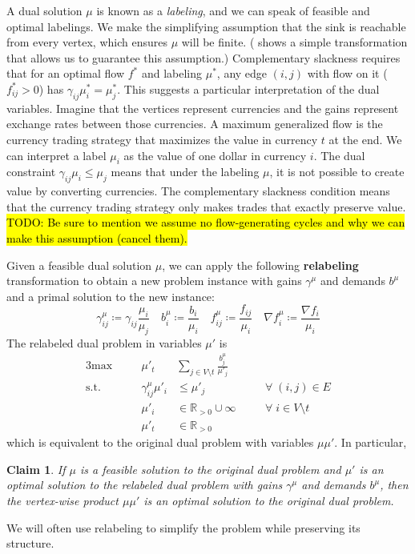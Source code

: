 \documentclass[11pt]{article}
\newtheorem{claim}[theorem]{Claim}
\theoremstyle{definition}
\theoremstyle{definition}
\newcommand{\R}{\mathbb{R}}
\newcommand{\giij}{\gamma_{ij}^{\mu}}
\newcommand{\todo}[1]{\hl{TODO: #1}}
\begin{document}
        
	A dual solution $\mu$ is known as a \emph{labeling}, and we can speak of feasible and
	optimal labelings. We make the simplifying assumption that the sink is reachable from every vertex, which ensures $\mu$ will be finite. (\cite{Olver2017} shows a simple transformation that allows us to guarantee this assumption.) 
	Complementary slackness requires that for an optimal flow $f^*$ and labeling $\mu^*$,
	any edge $(i, j)$ with flow on it ($f^*_{ij} > 0$) has $\gamma_{ij}\mu^*_i = \mu^*_j$.
	This suggests a particular interpretation of the dual variables. Imagine that
	the vertices represent currencies and the gains represent exchange rates between those currencies.
	A maximum generalized flow is the currency trading strategy that maximizes the value in currency
	$t$ at the end. We can interpret a label $\mu_i$ as the value of one dollar in currency $i$.
	The dual constraint $\gamma_{ij} \mu_i \leq \mu_j$ means that under the labeling $\mu$,
	it is not possible to create value by converting currencies.
	The complementary slackness condition means that the currency trading strategy
	only makes trades that exactly preserve value.
    \todo{Be sure to mention we assume no flow-generating cycles and why we can make this assumption (cancel them).}
	
	Given a feasible dual solution $\mu$, we can apply the following \textbf{relabeling}
    transformation to obtain a new problem instance with gains $\gamma^\mu$ and demands $b^\mu$
    and a primal solution to the new instance:
	\[ \gamma_{ij}^\mu \coloneqq \gamma_{ij} \frac{\mu_i}{\mu_j} \quad
	b_i^\mu \coloneqq \frac{b_i}{\mu_i} \quad
    f_{ij}^\mu \coloneqq \frac{f_{ij}}{\mu_i} \quad
	\nabla f_i^\mu \coloneqq \frac{\nabla f_i }{\mu_i} \]
    The relabeled dual problem in variables $\mu'$ is
    \begin{alignat*}{3}
    \text{max} &\quad &\mu'_t &\sum_{j \in V \setminus t} \frac{b^\mu_j}{\mu'_j}  \\
    \text{s.t.}
    &   &\giij \mu'_i &\leq \mu'_j \quad &&\forall\; (i, j) \in E \\
    &   &\mu'_i &\in \R_{>0} \cup \infty \quad &&\forall\; i \in V \setminus t \\
    &   &\mu'_t &\in \R_{>0}
    \end{alignat*}
	which is equivalent to the original dual problem with variables $\mu \mu'$. In particular,
    \begin{claim}
    If $\mu$ is a feasible solution to the original dual problem and
    $\mu'$ is an optimal solution to the relabeled dual problem with gains
    $\gamma^\mu$ and demands $b^\mu$,
    then the vertex-wise product $\mu\mu'$ is an optimal solution to the original dual problem.
    \end{claim}
    We will often use relabeling to simplify the problem while preserving its structure.
    
\end{document}
